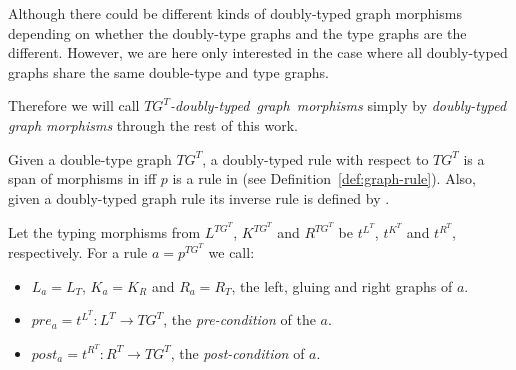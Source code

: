 \begin{example}
\end{example}

\begin{remark} Although there could be different kinds of doubly-typed graph morphisms depending on whether the doubly-type graphs and the type graphs are the different. However, we are here only interested in the case where all doubly-typed graphs share the same double-type and type graphs. 
  
Therefore we will call \mbox{\emph{$TG^T$-doubly-typed graph morphisms}} simply by \emph{doubly-typed graph morphisms} through the rest of this work.

\end{remark}


\begin{definition} Given a double-type graph $TG^T$, a doubly-typed rule with respect to $TG^T$ is a span of morphisms \doublyTypedRule{} in \doublyTypedGraphCategory{} iff $p$ is a rule in \typedGraphCategory{} (see Definition~\ref{def:graph-rule}). Also, given a doubly-typed graph rule \doublyTypedRule{} its inverse rule is defined by \inverseDoublyTypedRule{}.

  Let the typing morphisms from $L^{TG^T}$, $K^{TG^T}$ and $R^{TG^T}$ be $t^{L^T}$, $t^{K^T}$ and $t^{R^T}$, respectively. For a rule $a = p^{TG^T}$ we call:

  \begin{itemize}
    \item $L_a = L_T$, $K_a = K_R$ and $R_a = R_T$, the left, gluing and right graphs of $a$.
    \item $pre_a = t^{L^T} : L^T \rightarrow TG^T$, the \emph{pre-condition} of the $a$.
    \item $post_a = t^{R^T} : R^T \rightarrow TG^T$, the \emph{post-condition} of $a$.
  \end{itemize}
\end{definition}

\begin{example}
\end{example}

